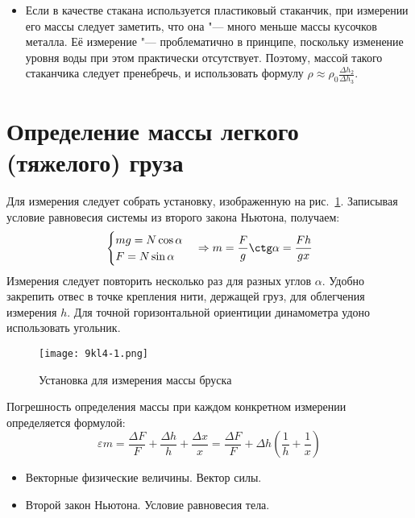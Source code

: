 \AdditionalNotes
\begin{itemize}
  \item Если в качестве стакана используется пластиковый стаканчик, при измерении его массы следует заметить, что она "--- много меньше массы кусочков металла. Её измерение "--- проблематично в принципе, поскольку изменение уровня воды при этом практически отсутствует. Поэтому, массой такого стаканчика следует пренебречь, и использовать формулу \(\rho \approx \rho_0 \frac{\Delta h_2}{\Delta h_3}\).
\end{itemize}
\section{Определение массы легкого (тяжелого) груза}
\SolveVariant
Для измерения следует собрать установку, изображенную на рис.~\ref{fig:9kl4:inst}. Записывая условие равновесия системы из второго закона Ньютона, получаем:
\begin{equation*}
    \begin{cases}
    mg=N\cos\alpha\\
    F=N\sin\alpha
    \end{cases}
    \Rightarrow m=\frac{F}{g} \ctg \alpha = \frac{F h}{g x}
\end{equation*}
Измерения следует повторить несколько раз для разных углов \(\alpha\). Удобно закрепить отвес в точке крепления нити, держащей груз, для облегчения измерения \(h\). Для точной горизонтальной ориентиции динамометра удоно использовать угольник.
\begin{figure}[h]
    \centering
    \texttt{[image: 9kl4-1.png]}
    \caption{Установка для измерения массы бруска}
    \label{fig:9kl4:inst}
 \end{figure}
\MesErrors
Погрешность определения массы при каждом конкретном измерении определяется формулой:
\begin{equation}
    \varepsilon m = \frac{\Delta F}{F} + \frac{\Delta h}{h} + \frac{\Delta x}{x}= \frac{\Delta F}{F}+\Delta h \left(\frac{1}{h} + \frac{1}{x}\right)
    \label{eq:9kl4:err}
\end{equation}
\SchoolBase
\begin{itemize}
    \item Векторные физические величины. Вектор силы.
    \item Второй закон Ньютона. Условие равновесия тела.
\end{itemize}
